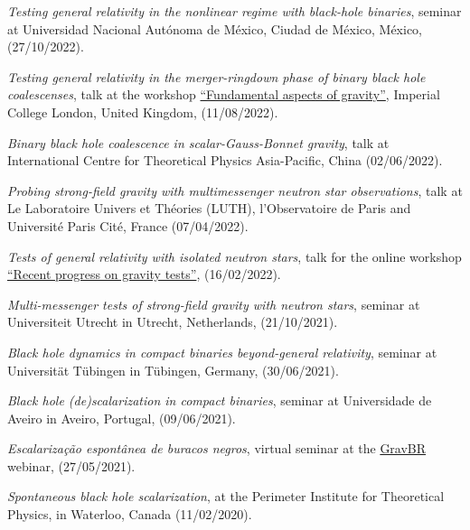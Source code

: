 \documentclass[11pt]{article}
\begin{document}
\begin{etaremune}[topsep=0pt,partopsep=0pt]
    \item
    \emph{Testing general relativity in the nonlinear regime with black-hole binaries},
    seminar at Universidad Nacional Aut\'onoma de M\'exico, Ciudad de M\'exico, M\'exico,
    (27/10/2022).

    \item
    \emph{Testing general relativity in the merger-ringdown phase of binary black hole coalescenses},
    talk at the workshop \href{https://sites.google.com/view/fundamental-aspects-of-gravity}{``Fundamental aspects of gravity''}, Imperial College London, United Kingdom,
    (11/08/2022).

    \item
    \emph{Binary black hole coalescence in scalar-Gauss-Bonnet gravity},
    talk at International Centre for Theoretical Physics Asia-Pacific,
    China
    (02/06/2022).

    \item
    \emph{Probing strong-field gravity with multimessenger neutron star observations},
    talk at Le Laboratoire Univers et Th\'eories (LUTH), l'Observatoire de Paris and Universit\'e Paris Cit\'e,
    France
    (07/04/2022).

    \item
    \emph{Tests of general relativity with isolated neutron stars},
    talk for the online workshop \href{https://honghui-liu.github.io/gravity-test/}{``Recent progress on gravity tests''},
    (16/02/2022).

    \item
    \emph{Multi-messenger tests of strong-field gravity
    with neutron stars},
    seminar at Universiteit Utrecht in Utrecht, Netherlands,
    (21/10/2021).

    \item
    \emph{Black hole dynamics in compact binaries beyond-general relativity},
    seminar at Universit\"at T\"ubingen in T\"ubingen, Germany,
    (30/06/2021).

    \item
    \emph{Black hole (de)scalarization in compact binaries},
    seminar at Universidade de Aveiro in Aveiro, Portugal,
    (09/06/2021).

    \item
    \emph{Escalariza{\c c}{\~a}o espont{\^a}nea de buracos negros},
    virtual seminar at the
    \href{https://sites.google.com/view/antoniodpj/gravbr}{GravBR} webinar,
    (27/05/2021).

    \item
    \emph{Spontaneous black hole scalarization},
    at the Perimeter Institute for Theoretical Physics,
    in Waterloo, Canada (11/02/2020).


\end{etaremune}
\end{document}
